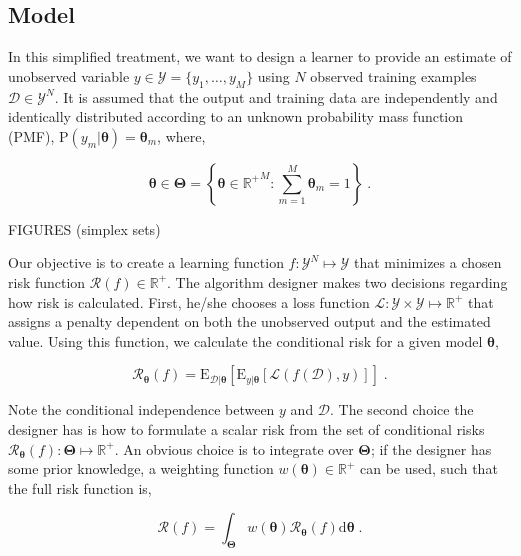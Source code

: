 \documentclass[12pt]{article}
\begin{document}
\subsection{Model}

In this simplified treatment, we want to design a learner to provide an estimate of unobserved variable $y \in \mathcal{Y} = \{ y_1, \ldots, y_M \}$ using $N$ observed training examples $\mathcal{D} \in \mathcal{Y}^N$. It is assumed that the output and training data are independently and identically distributed according to an unknown probability mass function (PMF), $\text{P}(y_m|\bm{\theta}) = \bm{\theta}_m$, where,

\begin{equation}
\bm{\theta} \in \bm{\Theta} = \left\{ \bm{\theta} \in {\mathbb{R}^+}^M: \sum_{m=1}^M \bm{\theta}_m = 1 \right\} \;. 
\end{equation}

FIGURES (simplex sets)

Our objective is to create a learning function $f: \mathcal{Y}^N \mapsto \mathcal{Y}$ that minimizes a chosen risk function $\mathcal{R}(f) \in \mathbb{R}^+$.  The algorithm designer makes two decisions regarding how risk is calculated. First, he/she chooses a loss function $\mathcal{L}: \mathcal{Y} \times \mathcal{Y} \mapsto \mathbb{R}^+$ that assigns a penalty dependent on both the unobserved output and the estimated value. Using this function, we calculate the conditional risk for a given model $\bm{\theta}$,

\begin{equation}
\mathcal{R}_{\bm{\theta}}(f) = \text{E}_{\mathcal{D}|\bm{\theta}} \left[ \text{E}_{y|\bm{\theta}} \left[ \mathcal{L}(f(\mathcal{D}),y) \right] \right] \;.
\end{equation}

Note the conditional independence between $y$ and $\mathcal{D}$. The second choice the designer has is how to formulate a scalar risk from the set of conditional risks $\mathcal{R}_{\bm{\theta}}(f): \bm{\Theta} \mapsto \mathbb{R}^+$. An obvious choice is to integrate over $\bm{\Theta}$; if the designer has some prior knowledge, a weighting function $w(\bm{\theta}) \in \mathbb{R}^+$ can be used, such that the full risk function is,

\begin{equation}
\mathcal{R}(f) = \int_{\bm{\Theta}} w(\bm{\theta}) \mathcal{R}_{\bm{\theta}}(f)\mathrm{d}\bm{\theta} \;.
\end{equation}
\end{document}

